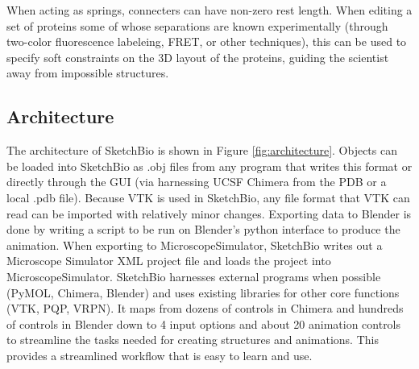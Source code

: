 \documentclass[twocolumn]{bmcart}%
\begin{document}
When acting as springs, connecters can have non-zero rest length.  When editing a set of proteins some of whose separations are known experimentally (through two-color fluorescence labeleing, FRET, or other techniques), this can be used to specify soft constraints on the 3D layout of the proteins, guiding the scientist away from impossible structures.

\subsection*{Architecture}

The architecture of SketchBio is shown in Figure \ref{fig:architecture}.  Objects can be loaded into SketchBio as .obj files from any program that writes this format or directly through the GUI (via harnessing UCSF Chimera from the PDB or a local .pdb file).  Because VTK is used in SketchBio, any file format that VTK can read can be imported with relatively minor changes.  Exporting data to Blender is done by writing a script to be run on Blender's python interface to produce the animation.  When exporting to MicroscopeSimulator, SketchBio writes out a Microscope Simulator XML project file and loads the project into MicroscopeSimulator.  SketchBio harnesses external programs when possible (PyMOL, Chimera, Blender) and uses existing libraries for other core functions (VTK, PQP, VRPN).  It maps from dozens of controls in Chimera and hundreds of controls in Blender down to 4 input options and about 20 animation controls to streamline the tasks needed for creating structures and animations.  This provides a streamlined workflow that is easy to learn and use.
\end{document}
